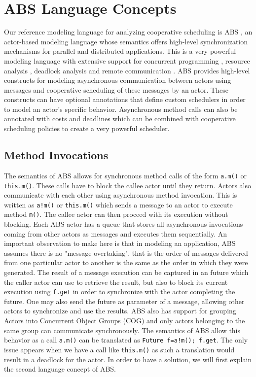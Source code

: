 

\section{ABS Language Concepts}
\label{lang}
Our reference modeling language for analyzing cooperative scheduling is ABS \cite{abs}, an actor-based modeling language whose semantics offers high-level synchronization mechanisms for parallel and  distributed applications. This is a very powerful modeling language with extensive support for concurrent programming \cite{cog}, resource analysis \cite{saco}, deadlock analysis \cite{dead} and remote communication \cite{dis,cloud}. ABS provides  high-level constructs for modeling asynchronous communication between actors using messages and cooperative scheduling of these messages by an actor.
These constructs can have optional annotations that define custom schedulers in order to model an actor's specific behavior. Asynchronous method calls can also be annotated with costs and deadlines which can be combined with cooperative scheduling policies to create a very powerful scheduler.

\subsection{Method Invocations}\label{amc}
The semantics of ABS allows for synchronous method calls of the form \lstinline|a.m()| or \lstinline|this.m()|. These calls have to block the callee actor until they return. Actors also communicate with each other using asynchronous method invocation. This is written as  \lstinline|a!m()| or \lstinline|this.m()| which sends a message to an actor to execute method \lstinline|m()|. The callee actor can then proceed with its execution without blocking. Each ABS actor has a queue that stores all asynchronous invocations coming from other actors as messages and executes them sequentially. An important observation to make here is that in modeling an application, ABS assumes there is no "message overtaking", that is the order of messages delivered from one particular actor to another is the same as the order in which they were generated.  The result of a message execution can be captured in an future which the caller actor can use to retrieve the result, but also to block its current execution using \lstinline|f.get|  in order to synchronize with the actor completing the future. One may also send the future as parameter of a message, allowing other actors to synchronize and use the results. ABS also has support for grouping Actors into Concurrent Object Groups (COG) and only actors belonging to the same group can communicate synchronously. The semantics of ABS allow this behavior as a call \lstinline|a.m()| can be translated as \lstinline|Future f=a!m(); f.get|. The only issue appears when we have a call like \lstinline|this.m()| as such a translation would result in a deadlock for the actor. In order to have a solution, we will first explain the second language concept of ABS.


